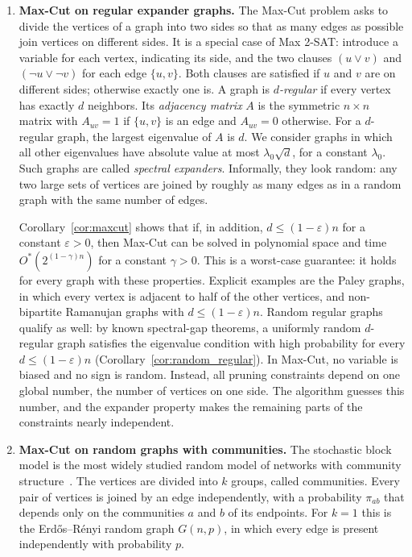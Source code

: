 \documentclass[11pt,a4paper]{article}
\theoremstyle{definition}
\theoremstyle{remark}
\newcommand{\Ostar}{O^{*}}
\begin{document}
\begin{enumerate}
\item \textbf{Max-Cut on regular expander graphs.}
The Max-Cut problem asks to divide the vertices of a graph into two sides
so that as many edges as possible join vertices on different sides. It is
a special case of Max 2-SAT: introduce a variable for each vertex,
indicating its side, and the two clauses $(u\vee v)$ and
$(\neg u\vee\neg v)$ for each edge $\{u,v\}$. Both clauses are satisfied if
$u$ and $v$ are on different sides; otherwise exactly one is. A graph is
\emph{$d$-regular} if every vertex has exactly $d$ neighbors. Its
\emph{adjacency matrix} $A$ is the symmetric $n\times n$ matrix with
$A_{uv}=1$ if $\{u,v\}$ is an edge and $A_{uv}=0$ otherwise. For a
$d$-regular graph, the largest eigenvalue of $A$ is $d$. We consider
graphs in which all other eigenvalues have absolute value at most
$\lambda_0\sqrt d$, for a constant $\lambda_0$. Such graphs are called
\emph{spectral expanders}. Informally, they look random: any two large
sets of vertices are joined by roughly as many edges as in a random graph
with the same number of edges.

Corollary~\ref{cor:maxcut} shows that if, in addition,
$d\le(1-\varepsilon)n$ for a constant $\varepsilon>0$, then Max-Cut can be
solved in polynomial space and time $\Ostar(2^{(1-\gamma)n})$ for a
constant $\gamma>0$. This is a worst-case
guarantee: it holds for every graph with these properties. Explicit
examples are the Paley graphs, in which every vertex is adjacent to half
of the other vertices, and non-bipartite Ramanujan graphs with
$d\le(1-\varepsilon)n$. Random regular graphs qualify as well: by known
spectral-gap theorems, a uniformly random $d$-regular graph satisfies the
eigenvalue condition with high probability for every
$d\le(1-\varepsilon)n$ (Corollary~\ref{cor:random_regular}). In Max-Cut,
no variable is biased and no sign is random. Instead, all pruning
constraints depend on one global number, the number of vertices on one
side. The algorithm guesses this number, and the expander property makes
the remaining parts of the constraints nearly independent.

\item \textbf{Max-Cut on random graphs with communities.}
The stochastic block model is the most widely studied random model of
networks with community structure~\cite{Abbe18}. The vertices are divided
into $k$ groups, called communities. Every pair of vertices is joined by an
edge independently, with a probability $\pi_{ab}$ that depends only on the
communities $a$ and $b$ of its endpoints. For $k=1$ this is the
Erd\H{o}s--R\'enyi random graph $G(n,p)$, in which every edge is present
independently with probability $p$.


\end{enumerate}
\end{document}
